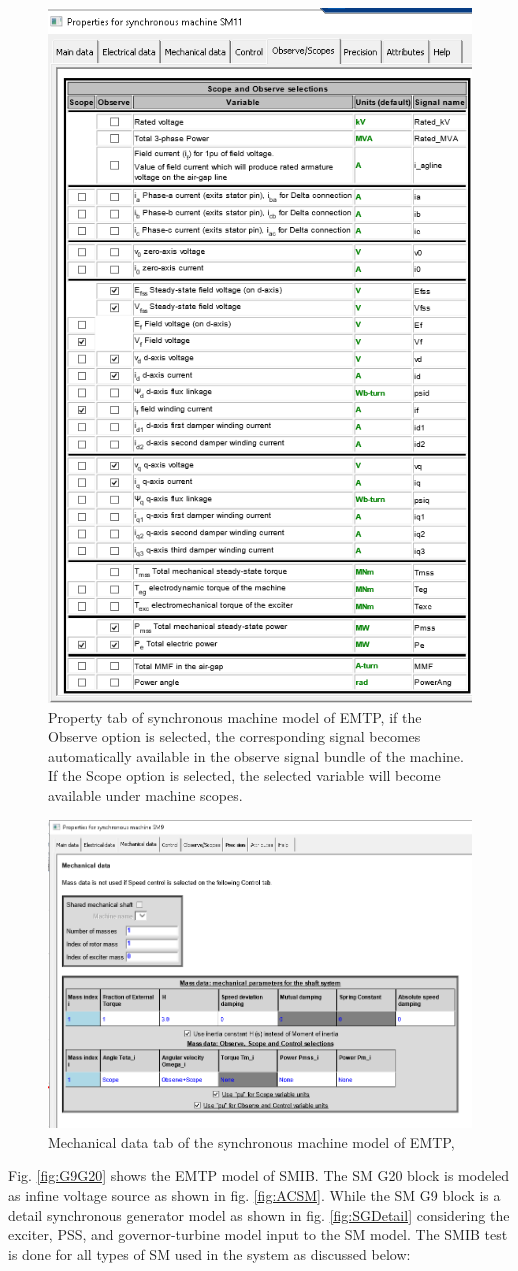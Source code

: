 \documentclass{report}
\begin{document}
\begin{figure}
    \centering
    \includegraphics[width=0.5\linewidth]{Figure_Nordic/EMTPSM.png}
    \caption{Property tab of synchronous machine model of EMTP, if the Observe option is selected, the corresponding signal becomes automatically available in the observe signal bundle of the machine. If the Scope option is selected, the selected variable will become available under machine scopes.
 }
    \label{fig:EMTPSMtab}
\end{figure}
\begin{figure}
    \centering
    \includegraphics[width=0.5\linewidth]{Figure_Nordic/EMTPMechanicalData.png}
    \caption{Mechanical data tab of the  synchronous machine model of EMTP,}
    \label{fig:EMTPSMtab2}
\end{figure}
Fig. \ref{fig:G9G20} shows the EMTP model of SMIB. The SM G20 block is modeled as infine voltage source as shown in fig. \ref{fig:ACSM}.  While the SM G9 block is a detail synchronous generator model as shown in fig. \ref{fig:SGDetail} considering the exciter, PSS, and governor-turbine model input to the SM model. The SMIB test is done for all types of SM used in the system as discussed below: 
\end{document}
